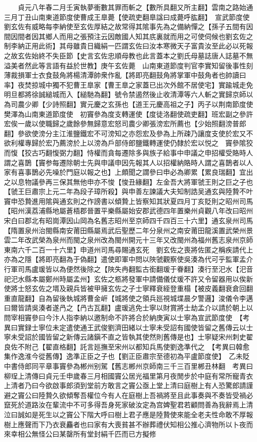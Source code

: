 　　貞元八年春二月壬寅執夢衝數其罪而斬之【數所具翻又所主翻】雲南之路始通　三月丁丑山南東道節度使曹成王臯薨【使疏吏翻臯諡曰成薨呼肱翻】　宣武節度使劉玄佐有威略每李納使至玄佐厚結之故常得其隂事先為之備納憚之【孫子五間有因間因間者因其鄉人而用之張預注云因敵國人知其㡳裏就而用之可使伺候也劉玄佐之制李納正用此術】其母雖貴日織絹一匹謂玄佐曰汝本寒微天子富貴汝至此必以死報之故玄佐始終不失臣節【史言玄佐忠順母教也此言蓋本之劉氏母墓誌唐人誌墓不無溢美者然此等言語有益於世教】庚午玄佐薨　山南東道節度判官李實知留後事性刻薄裁損軍士衣食鼓角將楊清潭帥衆作亂【將即亮翻鼓角將掌軍中鼓角者也帥讀曰率】夜焚掠城中獨不犯曹王臯家【曹王臯之家蓋已出次外館不居使宅】實踰城走免明旦都將徐誠縋城而入【縋馳為翻】號令禁遏然後止收清潭等六人斬之實歸京師以為司農少卿【少詩照翻】實元慶之玄孫也【道王元慶高祖之子】丙子以荆南節度使樊澤為山南東道節度使　初竇參為度支轉運使【度徒洛翻使疏吏翻】班宏副之參許宏俟一歲以使職歸之歲餘參無歸意宏怒司農少卿張滂宏所薦也【少始照翻滂普郎翻】參欲使滂分主江淮鹽鐵宏不可滂知之亦怨宏及參為上所疎乃讓度支使於宏又不欲利權專歸於宏乃薦滂於上以滂為戶部侍郎鹽鐵轉運使仍隸於宏以悦之　竇參隂狡而愎【狡古巧翻愎弼力翻】恃權而貪每遷除多與族子給事中申議之申招權受賂時人謂之喜鵲【竇参每遷除朝士先與申議申因先報其人以招權納賂時人謂之喜鵲者以人家有喜事鵲必先噪於門庭以報之也】上頗聞之謂參曰申必為卿累【累良瑞翻】宜出之以息物議參再三保其無他申亦不悛【悛丑緣翻】左金吾大將軍虢王則之巨之子也【虢王巨肅宗上元二年為段子璋所殺】與申善左諫議大夫知制誥吴通玄與陸贄不叶竇申恐贄進用隂與通玄則之作謗書以傾贄上皆察知其狀夏四月丁亥貶則之昭州司馬【昭州漢荔浦縣地屬蒼梧郡晉置平樂縣屬始安郡武德四年置樂州貞觀八年改曰昭州宋白曰郡北有昭崗潭因山岡為名舊志昭州至京師四千四百三十六里】通玄泉州司馬【隋置泉州治閩縣南安莆田縣屬焉武后聖歷二年分泉州之南安莆田龍溪置武榮州景雲二年改武榮為泉州而閩之泉州改為閩州開元十三年又改閩州為福州舊志泉州京師東南六千二百一十六里】申道州司馬尋賜通玄死　劉玄佐之喪將佐匿之稱疾請代上亦為之隱【將即亮翻為于偽翻】遣使即軍中問以陜虢觀察使吳湊為代可乎監軍孟介行軍司馬盧瑗皆以為便然後除之【陜失冉翻監古銜翻瑗于眷翻】湊行至汜水【汜音祀汜水縣本屬鄭州時屬孟州】玄佐之柩將發軍中請備儀仗瑗不許又令留器用以俟新使將士怒玄佐之壻及親兵皆被甲擁玄佐之子士寧釋衰絰登重榻【被皮義翻衰倉回翻重直龍翻】自為留後執城將曹金㟁【城將使之領兵廵視城堞晨夕警邏】浚儀令李邁曰爾皆請吳湊者遂冎之【冎古瓦翻】盧瑗逃免士寧以財賞將士劫孟介以請於朝上以問宰相竇參曰今汴人指李納以邀制命不許將合於納庚寅以士寧為宣武節度使　【考異曰實録士寧位未定遣使通王武俊劉濟田緒以士寧未受詔有國使皆留之舊傳云以士寧未受詔於國皆留之新傳云諸鎭不直之皆執其使然則舊傳是也】士寧疑宋州刺史翟良佐不附己【翟直格翻】託言廵撫至宋州以都知兵馬使劉逸準代之　【考異曰韓愈集作逸淮今從舊傳】逸準正臣之子也【劉正臣肅宗至德初為平盧節度使】　乙未貶中書侍郎同平章事竇參為郴州别駕【舊志郴州京師南三千三百里郴丑林翻　考異曰柳珵上清傳曰貞元壬申歲春三月相國竇公居光福里第月夜閒步於中庭有常所寵青衣上清者乃曰今欲啟事郎須到堂前方敢言之竇公亟上堂上清曰庭樹上有人恐驚郎請謹避之竇公曰陸贄久欲傾奪吾權位今有人在庭樹上吾禍將至且此事奏與不奏皆受禍必竄死於道路汝在輩流中不可多得吾身死家破汝定為宫婢聖君若顧問善為我辭焉上清泣曰誠如是死生以之竇公下階大呼曰樹上君子應是陸贄使來能全老夫性命敢不厚報樹上應聲而下乃衣衰麤者也曰家有大喪貧甚不辦葬禮伏知相公推心濟物所以卜夜而來幸相公無怪公曰某罄所有堂封絹千匹而已方擬修
